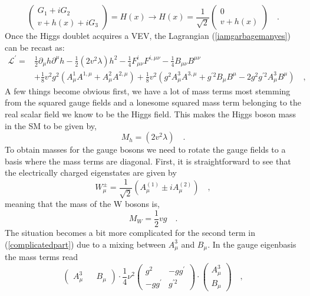 \documentclass[12pt]{article}
\begin{document}
\begin{equation}
 \begin{pmatrix}
G_1 + i G_2 \\ 
v + h(x) + i G_3 
\end{pmatrix} = H (x) \rightarrow H (x) =  \frac{1}{\sqrt{2}} \begin{pmatrix}
0 \\ 
v + h(x) 
\end{pmatrix} \quad .
\label{shame}
\end{equation}
Once the Higgs doublet acquires a VEV, the Lagrangian (\ref{iamgarbagemanyes}) can be recast as:
\begin{align}
\mathcal{L}^\prime = & \frac{1}{2} \partial_\mu h \partial^\mu h - \frac{1}{2} (2v^2 \lambda) h^2
 - \frac{1}{4} F^i_{\mu \nu} F^{i , \mu \nu} - \frac{1}{4} B_{\mu \nu} B^{\mu \nu}  \nonumber \\
& + \frac{1}{8} v^2 g^2 (A^1_\mu A^{1,\mu}+ A^2_\mu A^{2,\mu}) +  \frac{1}{8} v^2  (g^2  A^3_\mu A^{3,\mu} + g^{\prime 2} B_\mu B^\mu - 2 g^2 g^{\prime 2} A^3_\mu B^\mu ) \quad , 
\label{complicatedpart}
\end{align}
A few things become obvious first, we have a lot of mass terms most stemming from the squared gauge fields and a lonesome squared mass term belonging to the real scalar field we know to be the Higgs field. This makes the Higgs boson mass in the SM to be given by,
%
\begin{equation}
M_h= (2v^2 \lambda) \quad .  
\end{equation}
%
To obtain masses for the gauge bosons we need to rotate the gauge fields to a basis where the mass terms are diagonal. First, it is straightforward to see that the electrically charged eigenstates are given by %
\begin{equation}
W^\pm_\mu = \frac{1}{\sqrt{2}} (A^{(1)}_\mu \pm i A^{(2)}_\mu) \quad , 
\label{gagestate}
\end{equation}
meaning that the mass of the W bosons is, 
\begin{equation}
M_W= \frac{1}{2} v g \quad .
\end{equation}
The situation becomes a bit more complicated for the second term in (\ref{complicatedpart}) due to a mixing between $A_\mu^3$ and $B_\mu$. In the gauge eigenbasis the mass terms read
\begin{equation}
\begin{pmatrix}
A_\mu^3 && B_\mu
\end{pmatrix} \cdot  \frac{1}{4} \nu ^2 \begin{pmatrix}
g^2  & -g g^\prime \\
-g g^\prime & g^{\prime 2} 
\end{pmatrix} \cdot \begin{pmatrix}
A_\mu^3 \\  B_\mu
\end{pmatrix}  \quad , 
\end{equation} 
\end{document}
